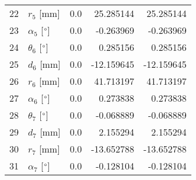\documentclass{standalone}%
\begin{document}
\begin{tabular}{llrrr}
22 &              $r_{5}$ [mm] &       0.0 &  25.285144 &  25.285144 \\
23 &  $\alpha_{5}$ [$\degree$] &       0.0 &  -0.263969 &  -0.263969 \\
24 &  $\theta_{6}$ [$\degree$] &       0.0 &   0.285156 &   0.285156 \\
25 &              $d_{6}$ [mm] &       0.0 & -12.159645 & -12.159645 \\
26 &              $r_{6}$ [mm] &       0.0 &  41.713197 &  41.713197 \\
27 &  $\alpha_{6}$ [$\degree$] &       0.0 &   0.273838 &   0.273838 \\
28 &  $\theta_{7}$ [$\degree$] &       0.0 &  -0.068889 &  -0.068889 \\
29 &              $d_{7}$ [mm] &       0.0 &   2.155294 &   2.155294 \\
30 &              $r_{7}$ [mm] &       0.0 & -13.652788 & -13.652788 \\
31 &  $\alpha_{7}$ [$\degree$] &       0.0 &  -0.128104 &  -0.128104 \\
\bottomrule
\end{tabular}
%
\end{document}
